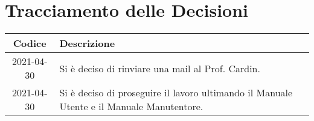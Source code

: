 \section*{Tracciamento delle Decisioni}

\begin{center}
	\begin{longtable}{|c|p{13cm}|}
	\hline
	\rowcolor{lighter-grayer}
	\textbf{Codice} & \textbf{Descrizione} \\
	\hline
	\endfirsthead

	
	
	2021-04-30 & Si è deciso di rinviare una mail al Prof. Cardin.  \\
	\hline
	2021-04-30 & Si è deciso di proseguire il lavoro ultimando il Manuale Utente e il Manuale Manutentore.  \\
	\hline
	

	\end{longtable}
\end{center}

